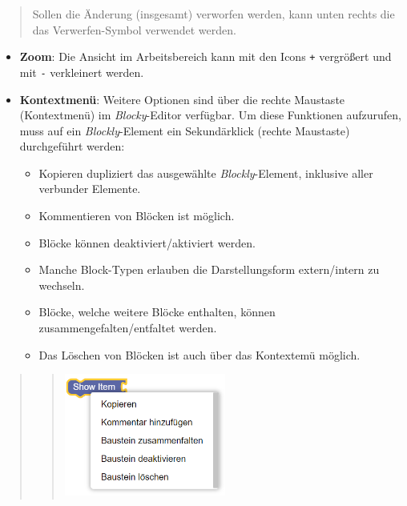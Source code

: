 \documentclass[
  letterpaper,
  DIV=11]{scrreprt}
\providecommand{\tightlist}{%
  \setlength{\itemsep}{0pt}\setlength{\parskip}{0pt}}\usepackage{longtable,booktabs,array}
\begin{document}
\begin{tcolorbox}
\begin{quote}
Sollen die Änderung (insgesamt) verworfen werden, kann unten rechts die
das Verwerfen-Symbol verwendet werden.
\end{quote}

\begin{itemize}
\tightlist
\item
  \textbf{Zoom}: Die Ansicht im Arbeitsbereich kann mit den Icons
  \texttt{+} vergrößert und mit \texttt{-} verkleinert werden.
\end{itemize}

\begin{itemize}
\item
  \textbf{Kontextmenü}: Weitere Optionen sind über die rechte Maustaste
  (Kontextmenü) im \emph{Blocky}-Editor verfügbar. Um diese Funktionen
  aufzurufen, muss auf ein \emph{Blockly}-Element ein Sekundärklick
  (rechte Maustaste) durchgeführt werden:

  \begin{itemize}
  \tightlist
  \item
    Kopieren dupliziert das ausgewählte \emph{Blockly}-Element,
    inklusive aller verbunder Elemente.
  \item
    Kommentieren von Blöcken ist möglich.
  \item
    Blöcke können deaktiviert/aktiviert werden.
  \item
    Manche Block-Typen erlauben die Darstellungsform extern/intern zu
    wechseln.
  \item
    Blöcke, welche weitere Blöcke enthalten, können
    zusammengefalten/entfaltet werden.
  \item
    Das Löschen von Blöcken ist auch über das Kontextemü möglich.
  \end{itemize}
\end{itemize}

\begin{quote}
\begin{quote}
\includegraphics[width=2.08333in,height=\textheight]{img/screenshot-context-menu-blockly-editor-example02-DEU.png}
\end{quote}
\end{quote}


\end{tcolorbox}
\end{document}
